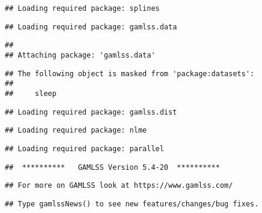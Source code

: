 \begin{Shaded}
\begin{Highlighting}[]
\end{Highlighting}
\end{Shaded}

\begin{verbatim}
## Loading required package: splines
\end{verbatim}

\begin{verbatim}
## Loading required package: gamlss.data
\end{verbatim}

\begin{verbatim}
## 
## Attaching package: 'gamlss.data'
\end{verbatim}

\begin{verbatim}
## The following object is masked from 'package:datasets':
## 
##     sleep
\end{verbatim}

\begin{verbatim}
## Loading required package: gamlss.dist
\end{verbatim}

\begin{verbatim}
## Loading required package: nlme
\end{verbatim}

\begin{verbatim}
## Loading required package: parallel
\end{verbatim}

\begin{verbatim}
##  **********   GAMLSS Version 5.4-20  **********
\end{verbatim}

\begin{verbatim}
## For more on GAMLSS look at https://www.gamlss.com/
\end{verbatim}

\begin{verbatim}
## Type gamlssNews() to see new features/changes/bug fixes.
\end{verbatim}

\begin{Shaded}
\begin{Highlighting}[]
\end{Highlighting}
\end{Shaded}

